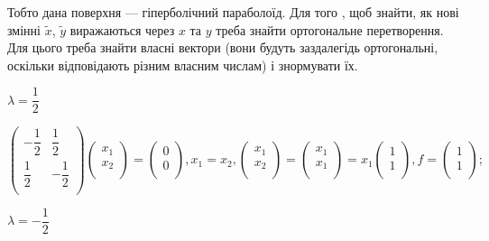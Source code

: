 Тобто дана поверхня --- гіперболічний параболоїд. Для того , щоб знайти, як
нові змінні $\tilde{x}$, $\tilde{y}$ виражаються через $x$ та $y$ треба знайти ортогональне
перетворення. Для цього треба знайти власні вектори (вони будуть
заздалегідь ортогональні, оскільки відповідають різним власним числам) і
знормувати їх.

$\lambda = \dfrac{1}{2}$

$$\begin{pmatrix}
	-\dfrac{1}{2} & \dfrac{1}{2} \\
	\dfrac{1}{2} & -\dfrac{1}{2} \\
\end{pmatrix} \begin{pmatrix}
	x_1 \\
	x_2 \\
\end{pmatrix} = \begin{pmatrix}
	0 \\
	0 \\
\end{pmatrix}, x_1 = x_2, \begin{pmatrix}
	x_1 \\
	x_2 \\
\end{pmatrix} = \begin{pmatrix}
	x_1 \\
	x_1 \\
\end{pmatrix} = x_1 \begin{pmatrix}
	1 \\
	1 \\
\end{pmatrix}, f = \begin{pmatrix}
	1 \\
	1 \\
\end{pmatrix};$$


$\lambda = -\dfrac{1}{2}$

